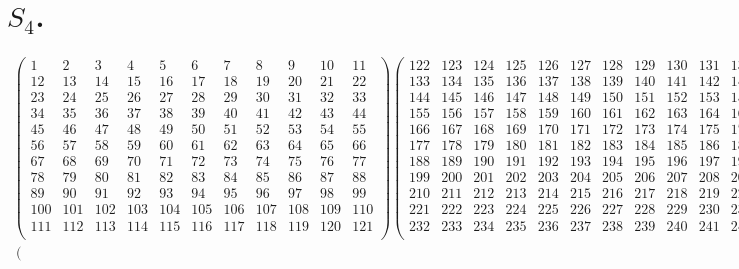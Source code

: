 \documentclass[12pt,a4paper]{amsart}
\begin{document}
\section{$S_4$.}

\begin{align*}
\left(
  \begin{array}{r|r|r|r|r|r|r|r|r|r|r}%
1&2&3&4&5&6&7&8&9&10&11\\%
\hline
12&13&14&15&16&17&18&19&20&21&22\\%
\hline
23&24&25&26&27&28&29&30&31&32&33\\%
\hline
34&35&36&37&38&39&40&41&42&43&44\\%
\hline
45&46&47&48&49&50&51&52&53&54&55\\%
\hline
56&57&58&59&60&61&62&63&64&65&66\\%
\hline
67&68&69&70&71&72&73&74&75&76&77\\%
\hline
78&79&80&81&82&83&84&85&86&87&88\\%
\hline
89&90&91&92&93&94&95&96&97&98&99\\%
\hline
100&101&102&103&104&105&106&107&108&109&110\\%
\hline
111&112&113&114&115&116&117&118&119&120&121\\%
\end{array}
\right)
%
\left(
\begin{array}{r|r|r|r|r|r|r|r|r|r|r}%
122&123&124&125&126&127&128&129&130&131&132\\%
\hline
133&134&135&136&137&138&139&140&141&142&143\\%
\hline
144&145&146&147&148&149&150&151&152&153&154\\%
\hline
155&156&157&158&159&160&161&162&163&164&165\\%
\hline
166&167&168&169&170&171&172&173&174&175&176\\%
\hline
177&178&179&180&181&182&183&184&185&186&187\\%
\hline
188&189&190&191&192&193&194&195&196&197&198\\%
\hline
199&200&201&202&203&204&205&206&207&208&209\\%
\hline
210&211&212&213&214&215&216&217&218&219&220\\%
\hline
221&222&223&224&225&226&227&228&229&230&231\\%
\hline
232&233&234&235&236&237&238&239&240&241&242\\%
\end{array}
\right)
\\
\left(
\begin{array}{r|r}%

\end{array}
\end{align*}
\end{document}
